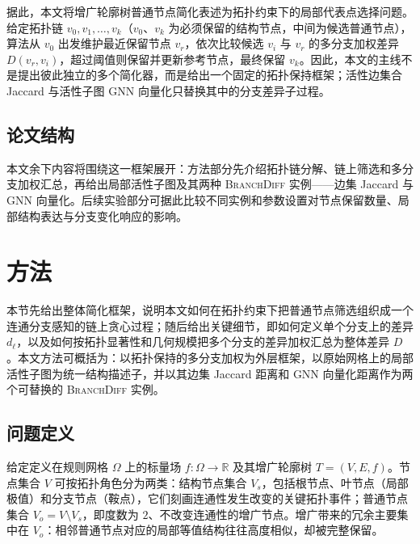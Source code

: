\documentclass[twocolumn, a4paper, 10pt]{article}
\begin{document}
据此，本文将增广轮廓树普通节点简化表述为拓扑约束下的局部代表点选择问题。给定拓扑链 $v_0,v_1,\ldots,v_k$（$v_0$、$v_k$ 为必须保留的结构节点，中间为候选普通节点），算法从 $v_0$ 出发维护最近保留节点 $v_r$，依次比较候选 $v_i$ 与 $v_r$ 的多分支加权差异 $D(v_r,v_i)$，超过阈值则保留并更新参考节点，最终保留 $v_k$。因此，本文的主线不是提出彼此独立的多个简化器，而是给出一个固定的拓扑保持框架；活性边集合 Jaccard 与活性子图 GNN 向量化只替换其中的分支差异子过程。

\subsection{论文结构}

本文余下内容将围绕这一框架展开：方法部分先介绍拓扑链分解、链上筛选和多分支加权汇总，再给出局部活性子图及其两种 \textsc{BranchDiff} 实例——边集 Jaccard 与 GNN 向量化。后续实验部分可据此比较不同实例和参数设置对节点保留数量、局部结构表达与分支变化响应的影响。

\section{方法}

本节先给出整体简化框架，说明本文如何在拓扑约束下把普通节点筛选组织成一个连通分支感知的链上贪心过程；随后给出关键细节，即如何定义单个分支上的差异 $d_\ell$，以及如何按拓扑显著性和几何规模把多个分支的差异加权汇总为整体差异 $D$。本文方法可概括为：以拓扑保持的多分支加权为外层框架，以原始网格上的局部活性子图为统一结构描述子，并以其边集 Jaccard 距离和 GNN 向量化距离作为两个可替换的 \textsc{BranchDiff} 实例。

\subsection{问题定义}

给定定义在规则网格 $\Omega$ 上的标量场 $f:\Omega\rightarrow\mathbb{R}$ 及其增广轮廓树 $T=(V,E,f)$。节点集合 $V$ 可按拓扑角色分为两类：结构节点集合 $V_s$，包括根节点、叶节点（局部极值）和分支节点（鞍点），它们刻画连通性发生改变的关键拓扑事件；普通节点集合 $V_o=V\setminus V_s$，即度数为 $2$、不改变连通性的增广节点。增广带来的冗余主要集中在 $V_o$：相邻普通节点对应的局部等值结构往往高度相似，却被完整保留。
\end{document}
